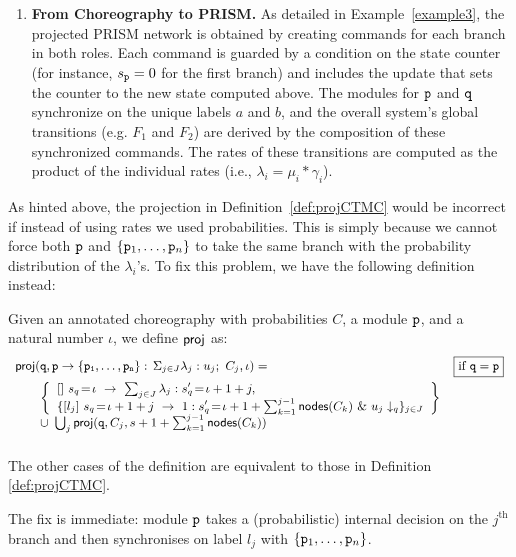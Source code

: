 \begin{example}
\begin{enumerate}
  \item \textbf{From Choreography to PRISM.} As detailed in
    Example \ref{example3}, the projected PRISM network is obtained by
    creating commands for each branch in both roles. Each command is
    guarded by a condition on the state counter (for instance,
    \(s_{\mathtt{p}}=0\) for the first branch) and includes the update
    that sets the counter to the new state computed above. The modules
    for \(\mathtt{p}\) and \(\mathtt{q}\) synchronize on the unique labels
    \(a\) and \(b\), and the overall system’s global transitions
    (e.g. \(F_1\) and \(F_2\)) are derived by the composition of these
    synchronized commands. The rates of these transitions are computed
    as the product of the individual rates (i.e.,
    \(\lambda_i = \mu_i * \gamma_i\)).
  \end{enumerate}

\end{example}

    As hinted above, the projection in Definition~\ref{def:projCTMC}
    would be incorrect if instead of using rates we used
    probabilities. This is simply because we cannot force both
    $\mathtt{p}$ and $\{\mathtt{p}_1,\ldots,\mathtt{p}_n\}$ to take the same
    branch with the probability distribution of the $\lambda_i$'s. To
    fix this problem, we have the following definition instead:
    \begin{definition}\label{def:projDTMC} Given an annotated
      choreography with probabilities $C$, a module $\mathtt{p}$, and a
      natural number $\iota$, we define $\mathsf{proj}$ as:
      \begin{displaymath}\small
        \begin{array}{lr}

          \proj (\role q,\interact{p}{\role p_1,\ldots,\role p_n}, \iota)= 
          &  \boxed{\text{if }\role q=\role p}\\[2mm]
          \qquad
          \left\{
          \begin{array}{lll}
            \commandBase {} {s_{q}\!=\! \iota}{\ \sum_{j\in J} \lambda_j: s'_{q}\!=\! \iota+1+j},\\ 
            \{\commandBase {l_j} {s_{q}\!=\! \iota+1+j}
            \ 1: s'_{q}\!=\! \iota+1+\sum_{k=1}^{j-1}\mathsf{nodes}({C_k})\ \&\ \projE
            {u_j}q\}_{j\in J}
          \end{array}
          \right\}
          \\
          \qquad\cup\ \bigcup_{j} \proj (\role q, C_j, s+1+\sum_{k=1}^{j-1}\mathsf{nodes}({C_k}))
          \\\\

        \end{array}
      \end{displaymath}
      The other cases of the definition are equivalent to those in
      Definition \ref{def:projCTMC}.
    \end{definition}
    The fix is immediate: module $\mathtt{p}$ takes a (probabilistic)
    internal decision on the $j^{\text{th}}$ branch and then
    synchronises on label $l_j$ with $\{\mathtt{p}_1,\ldots,\mathtt{p}_n\}$.       

